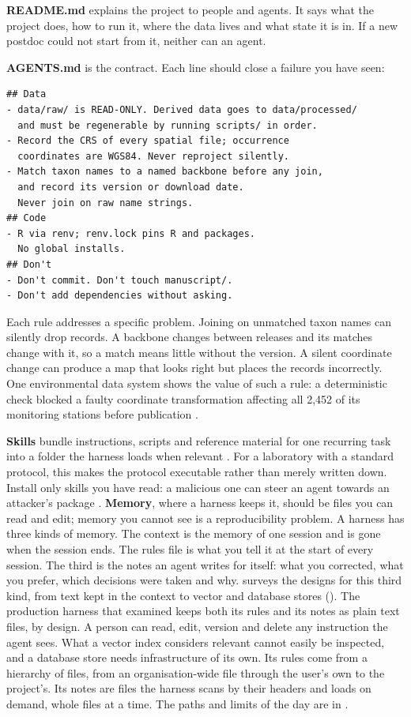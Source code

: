 \textbf{README.md} explains the project to people and agents. It says what the
project does, how to run it, where the data lives and what state it is in. If a
new postdoc could not start from it, neither can an agent.

\textbf{AGENTS.md} is the contract. Each line should close a failure you have
seen:

\begin{lstlisting}[caption={An AGENTS.md that earns its place}]
## Data
- data/raw/ is READ-ONLY. Derived data goes to data/processed/
  and must be regenerable by running scripts/ in order.
- Record the CRS of every spatial file; occurrence
  coordinates are WGS84. Never reproject silently.
- Match taxon names to a named backbone before any join,
  and record its version or download date.
  Never join on raw name strings.
## Code
- R via renv; renv.lock pins R and packages.
  No global installs.
## Don't
- Don't commit. Don't touch manuscript/.
- Don't add dependencies without asking.
\end{lstlisting}

Each rule addresses a specific problem. Joining on unmatched taxon names can
silently drop records. A backbone changes between releases and its matches
change with it, so a match means little without the version. A silent
coordinate change can produce a map that
looks right but places the records incorrectly. One environmental data system
shows the value of such a rule: a deterministic check blocked a faulty coordinate
transformation affecting all 2,452 of its monitoring stations before publication
\parencite{guan2026envismart}.

\textbf{Skills} bundle instructions, scripts and reference material for one
recurring task into a folder the harness loads when relevant
\parencite{anthropic2026skills}. For a laboratory with a standard protocol,
this makes the protocol executable rather than merely written down. Install only
skills you have read: a malicious one can steer an agent towards an attacker's
package \parencite{liu2026dependencysteering}.
\textbf{Memory}, where a harness keeps it, should be files you can read and
edit; memory you cannot see is a reproducibility problem. A harness has three
kinds of memory. The context is the memory of one session and is gone when
the session ends. The rules file is what you tell it at the start of every
session. The third is the notes an agent writes for itself: what you
corrected, what you prefer, which decisions were taken and why.
\textcite{du2026memory} surveys the designs for this third kind, from text
kept in the context to vector and database stores (). The
production harness that \textcite{liu2026claudecode} examined keeps both its
rules and its notes as plain text files, by design. A person can read, edit,
version and delete any instruction the agent sees. What a vector index
considers relevant cannot easily be inspected, and a database store needs
infrastructure of its own. Its rules come from a hierarchy of files, from an
organisation-wide file through the user's own to the project's. Its notes
are files the harness scans by their headers and loads on demand, whole files
at a time. The paths and limits of the day are in .


